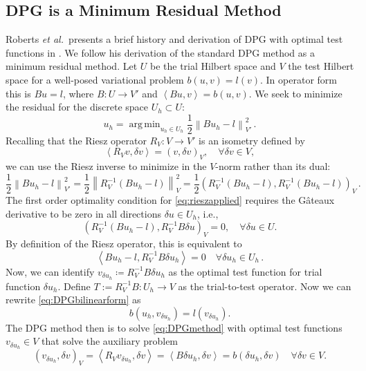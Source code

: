 \documentclass[letterpaper]{article}
\DeclareMathOperator*{\argmin}{\arg\,\min}
\newcommand{\eqnref}[1]{\eqref{eq:#1}}
\newcommand{\norm}[1]{\left\| #1 \right\|}
\newcommand{\LRp}[1]{\left( #1 \right)}
\newcommand{\LRa}[1]{\left\langle #1 \right\rangle}
\def\etal{{\it et al.~}}
\begin{document}
\subsection{DPG is a Minimum Residual Method}
Roberts \etal presents a brief history and derivation of DPG with optimal test functions in
\cite{DPGStokes}. We follow his derivation of the standard DPG method as a
minimum residual method. Let $U$ be the trial Hilbert space and $V$ the test
Hilbert space for a well-posed variational problem $b(u,v)=l(v)$. In operator
form this is $Bu=l$, where $B:U\rightarrow V'$ and $\LRa{Bu,v}=b(u,v)$. We seek to minimize the
residual for the discrete space $U_h\subset U$:
\begin{equation}
u_h=\argmin_{u_h\in U_h}\frac{1}{2}\norm{Bu_h-l}^2_{V'}\,.
\label{minresidual}
\end{equation}
Recalling that the Riesz operator $R_V:V\rightarrow V'$ is an isometry defined
by
\[
\LRa{R_Vv,\delta v}=\LRp{v,\delta v}_V,\quad\forall\delta v\in V,
\]
we can use the Riesz inverse to minimize in the $V$-norm rather than its dual:
\begin{equation}
\frac{1}{2}\norm{Bu_h-l}^2_{V'}=\frac{1}{2}\norm{R_V^{-1}(Bu_h-l)}^2_V
=\frac{1}{2}\LRp{R_V^{-1}(Bu_h-l),R_V^{-1}(Bu_h-l)}_V\,.
\label{eq:rieszapplied}
\end{equation}
The first order optimality condition for \eqnref{rieszapplied} requires
the G\^ateaux derivative to be zero in all directions $\delta u \in
U_h$, i.e.,
\[
\left(R_V^{-1}(Bu_h-l),R_V^{-1}B\delta u\right)_V = 0, \quad \forall \delta u \in U.
\]
By definition of the Riesz operator, this is equivalent to
\begin{equation}
\LRa{Bu_h-l,R_V^{-1}B\delta u_h}=0\quad\forall\delta u_h\in U_h\,.
\label{eq:DPGbilinearform}
\end{equation}
Now, we can identify $v_{\delta u_h}\coloneqq R_V^{-1}B\delta u_h$ as the
optimal test function for trial function $\delta u_h$. Define $T:=R_V^{-1}B:U_h\rightarrow V$ as the trial-to-test operator. Now we can rewrite
\eqnref{DPGbilinearform} as
\begin{equation}
b(u_h,v_{\delta u_h})=l(v_{\delta u_h}).
\label{eq:DPGmethod}
\end{equation}
The DPG method then is to solve \eqnref{DPGmethod} with optimal test functions
$v_{\delta u_h}\in V$ that solve the auxiliary problem
\begin{equation}
\LRp{v_{\delta u_h},\delta v}_V=\LRa{R_Vv_{\delta u_h},\delta v}
=\LRa{B\delta u_h,\delta v}=b(\delta u_h,\delta v)\quad\forall\delta v\in V.
\label{eq:optimaltestproblem}
\end{equation}
\end{document}
